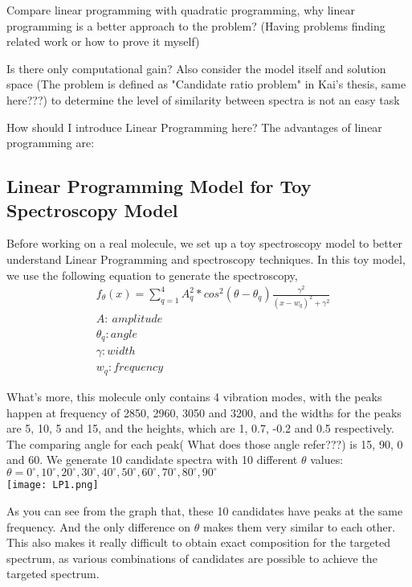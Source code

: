 	
	
	

	
	
	
	
	
	
Compare linear programming with quadratic programming, why linear programming is a better 	 	approach to the problem? (Having problems finding related work or how to prove it myself)
	
	Is there only computational gain?
	Also consider the model itself and solution space	
(The problem is defined as "Candidate ratio problem" in Kai's thesis, same here???)
	to determine the level of similarity between spectra is not an easy task 
	
	How should I introduce Linear Programming here?
	The advantages of linear programming are: 
	
\subsection{Linear Programming Model for Toy Spectroscopy Model}
Before working on a real molecule, we set up a toy spectroscopy model to better understand Linear Programming and spectroscopy techniques. In this toy model, we use the following equation to generate the spectroscopy, 
\begin{eqnarray}
& f_{\theta}(x) = \displaystyle\sum^{4}_{q=1} A_q^2 * cos^2(\theta - \theta_q)\frac{\gamma^2}{(x- w_q)^2 + \gamma^2} \nonumber \\
& A:~amplitude \nonumber \\
& \theta_q : angle \nonumber \\
& \gamma: width \nonumber \\
& w_q : frequency \nonumber 
\end{eqnarray}

What's more, this molecule only contains 4 vibration modes, with the peaks happen at frequency of 2850, 2960, 3050 and 3200, and the widths for the peaks are 5, 10, 5 and 15, and the heights, which are 1, 0.7, -0.2 and 0.5 respectively. The comparing angle for each peak( What does those angle refer???) is 15, 90, 0 and 60. We generate 10 candidate spectra with 10 different $\theta$ values:
$\theta = 0^{\circ}, 10^{\circ}, 20^{\circ}, 30^{\circ}, 40^{\circ}, 50^{\circ}, 60^{\circ}, 70^{\circ}, 80^{\circ}, 90^{\circ} $ \\

\texttt{[image: LP1.png]}

As you can see from the graph that, these 10 candidates have peaks at the same frequency. And the only difference on $\theta$ makes them very similar to each other. This also makes it really difficult to obtain exact composition for the targeted spectrum, as various combinations of candidates are possible to achieve the targeted spectrum.

